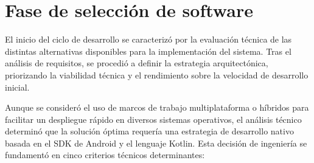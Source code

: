 
\section{Fase de selección de software}

El inicio del ciclo de desarrollo se caracterizó por la evaluación técnica de las distintas alternativas disponibles para la implementación del sistema. Tras el análisis de requisitos, se procedió a definir la estrategia arquitectónica, priorizando la viabilidad técnica y el rendimiento sobre la velocidad de desarrollo inicial.

Aunque se consideró el uso de marcos de trabajo multiplataforma o híbridos para facilitar un despliegue rápido en diversos sistemas operativos, el análisis técnico determinó que la solución óptima requería una estrategia de desarrollo nativo basada en el SDK de Android y el lenguaje Kotlin. Esta decisión de ingeniería se fundamentó en cinco criterios técnicos determinantes:

